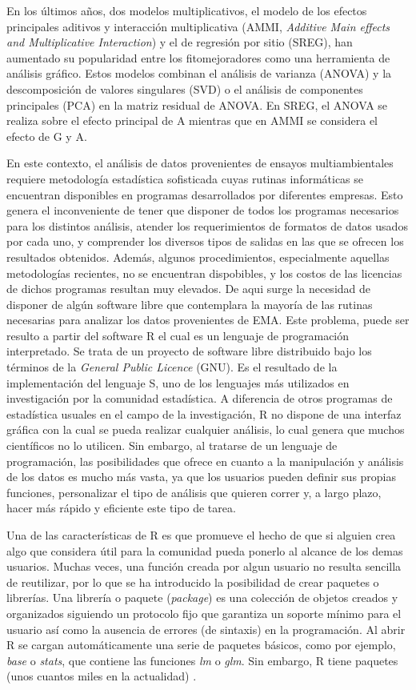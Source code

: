 En los últimos años, dos modelos multiplicativos, el modelo de los efectos principales aditivos y interacción multiplicativa (AMMI, \emph{Additive Main effects and Multiplicative Interaction}) y el de regresión por sitio (SREG), han aumentado su popularidad entre los fitomejoradores como una herramienta de análisis gráfico. Estos modelos combinan el análisis de varianza (ANOVA) y la descomposición de valores singulares (SVD) o el análisis de componentes principales (PCA) en la matriz residual de ANOVA. En SREG, el ANOVA se realiza sobre el efecto principal de A mientras que en AMMI se considera el efecto de G y A. 


En este contexto, el análisis de datos provenientes de ensayos multiambientales requiere metodología estadística sofisticada cuyas rutinas informáticas se encuentran disponibles en programas desarrollados por diferentes empresas. Esto genera el inconveniente de tener que disponer de todos los programas necesarios para los distintos análisis, atender los requerimientos de formatos de datos usados por cada uno, y comprender los diversos tipos de salidas en las que se ofrecen los resultados obtenidos. Además, algunos procedimientos, especialmente aquellas metodologías recientes, no se encuentran dispobibles, y los costos de las licencias de dichos programas resultan muy elevados. De aqui surge la necesidad de disponer de algún software libre que contemplara la mayoría de las rutinas necesarias para analizar los datos provenientes de EMA. Este problema, puede ser resulto a partir del software R el cual es un lenguaje de programación interpretado. Se trata de un proyecto de software libre distribuido bajo los términos de la \emph{General Public Licence} (GNU). Es el resultado de la implementación del lenguaje S, uno de los lenguajes más utilizados en investigación por la comunidad estadística. A diferencia de otros programas de estadística usuales en el campo de la investigación, R no dispone de una interfaz gráfica con la cual se pueda realizar cualquier análisis, lo cual genera que muchos científicos no lo utilicen. Sin embargo, al tratarse de un lenguaje de programación, las posibilidades que ofrece en cuanto a la manipulación y análisis de los datos es mucho más vasta, ya que los usuarios pueden definir sus propias funciones, personalizar el tipo de análisis que quieren correr y, a largo plazo, hacer más rápido y eficiente este tipo de tarea. 

Una de las características de R es que promueve el hecho de que si alguien crea algo que considera útil para la comunidad pueda ponerlo al alcance de los demas usuarios.  Muchas veces, una función creada por algun usuario no resulta sencilla de reutilizar, por lo que se ha introducido la posibilidad de crear paquetes o librerías. 
Una librería o paquete (\emph{package}) es una colección de objetos creados y organizados siguiendo un protocolo fijo que garantiza un soporte mínimo para el usuario así como la ausencia de errores (de sintaxis) en la programación.
Al abrir R se cargan automáticamente una serie de paquetes básicos, como por ejemplo, \emph{base} o \emph{stats}, que contiene las funciones \emph{lm} o \emph{glm}. Sin embargo, R tiene paquetes (unos cuantos miles en la actualidad) . 


